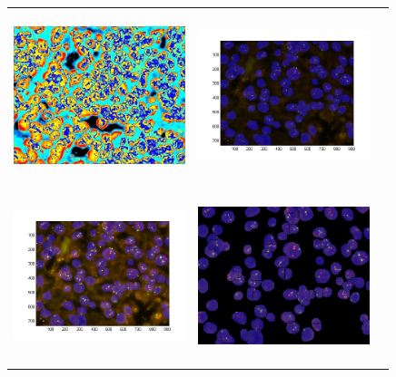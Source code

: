 \begin{tabular}{ |c|c|c| }
\includegraphics[width=5.0cm,height=5.0cm]{images/Her2Fish/4_RGB_LabelImg.jpg}  &
\includegraphics[width=5.0cm,height=5.0cm]{images/Her2Fish/B31-1677A108_ProcessedlabelimageWithSpotsEnhanced.jpg}  \\
\includegraphics[width=5.0cm,height=5.0cm]{images/Her2Fish/B31-1677A108_ProcessedlabelimageWithSpotsEnhanced2.jpg}  &
\includegraphics[width=5.0cm,height=5.0cm]{images/Her2Fish/B31-1677A108_ProcessedlabelimageWithSpotsEnhanced3.jpg}
\end{tabular}





